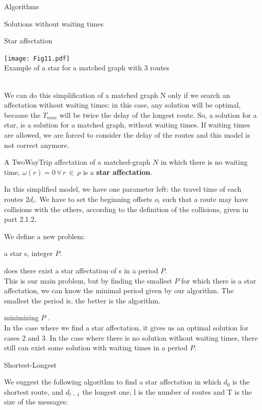 \documentclass[a4paper,10pt]{report}
\begin{document}
\begin{chapter}{Algorithms}
\begin{section}{Solutions without waiting times}
\begin{subsection}{Star affectation}
{{\begin{center}
\texttt{[image: Fig11.pdf]}\\
Example of a star for a matched graph with 3 routes
\end{center}


}}\\


We can do this simplification of a matched graph N only if we search an affectation without waiting times: in this case, any solution
will be optimal, because the $T_{max}$ will be twice the delay of the longest route. So, a solution for a star, is a solution for a matched
graph, without waiting times. If waiting times are allowed, we are forced to consider the delay of the routes and this model is not
correct anymore.

A TwoWayTrip affectation of a matched-graph $N$ in which there is no waiting time, $\omega(r) = 0 \,\forall\, r \,\in\, \rho$ is a {\bf star affectation}.

In this simplified model, we have one parameter left: the travel time of each routes $2d_i$.
We have to set the beginning offsets $o_i$ such that a route may have collisions with the others, 
according to the definition of the collisions, given in part 2.1.2.


We define a new problem: 



 a star s, integer $P$.

 does there exist a star affectation of s in a period $P$.\\

This is our main problem, but by finding the smallest $P$ for which there is a star affectation, we can know 
the minimal period given by our algorithm. The smallest the period is, the better is the algorithm.


 minimizing $P$ .\\

In the case where we find a star affectation, it gives us an optimal solution for cases 2 and 3.
In the case where there is no solution without waiting times, there still can exist some solution with waiting times in 
a period $P$.
\end{subsection}
\begin{subsection}{Shortest-Longest}
 
We suggest the following algorithm to find a star affectation in which $d_0$ is the shortest route, and $d_{l-1}$ the longest one, 
l is the number of routes and T is the size of the messages:


\end{subsection}
\end{section}
\end{chapter}
\end{document}
